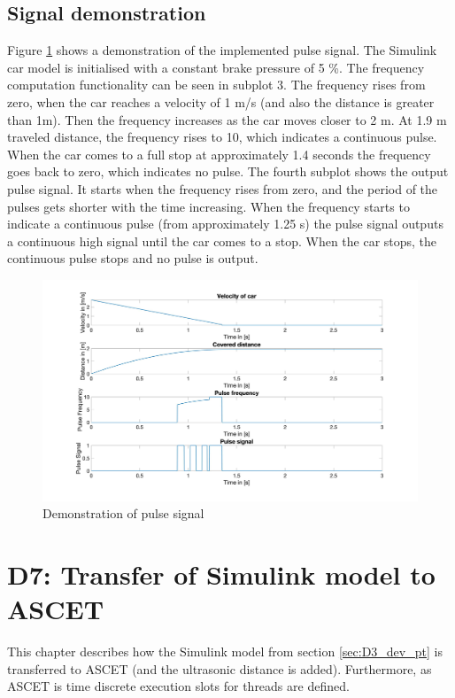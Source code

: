 \section{Signal demonstration}\label{sec:D6_SignalDemonstration}
Figure \ref{fig:D6_Result} shows a demonstration of the implemented pulse signal. The Simulink car model is initialised with a constant brake pressure of 5 \%. The frequency computation functionality can be seen in subplot 3. The frequency rises from zero, when the car reaches a velocity of 1 m/s (and also the distance is greater than 1m). Then the frequency increases as the car moves closer to 2 m. At 1.9 m traveled distance, the frequency rises to 10, which indicates a continuous pulse. When the car comes to a full stop at approximately 1.4 seconds the frequency goes back to zero, which indicates no pulse. The fourth subplot shows the output pulse signal. It starts when the frequency rises from zero, and the period of the pulses gets shorter with the time increasing. When the frequency starts to indicate a continuous pulse (from approximately 1.25 s) the pulse signal outputs a continuous high signal until the car comes to a stop. When the car stops, the continuous pulse stops and no pulse is output.

\begin{figure}[H]
\centering
\includegraphics[width=1\textwidth]{images/D6_result.jpg}
\caption{Demonstration of pulse signal}
\label{fig:D6_Result}
\end{figure}

\chapter{D7: Transfer of Simulink model to ASCET}\label{cha:D7}

This chapter describes how the Simulink model from section \ref{sec:D3_dev_pt} is transferred to ASCET (and the ultrasonic distance is added).
Furthermore, as ASCET is time discrete execution slots for threads are defined.

